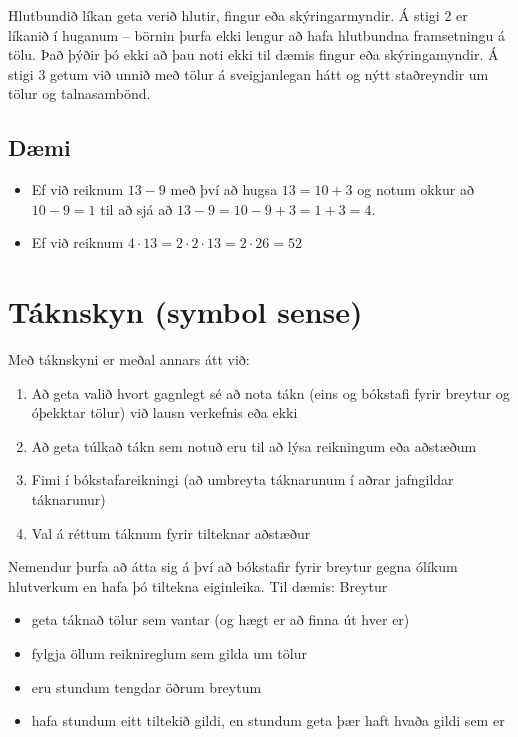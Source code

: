 \documentclass[
  icelandic,
]{book}
\providecommand{\tightlist}{%
  \setlength{\itemsep}{0pt}\setlength{\parskip}{0pt}}
\begin{document}
Hlutbundið líkan geta verið hlutir, fingur eða skýringarmyndir. Á stigi 2 er líkanið í huganum -- börnin þurfa ekki lengur að hafa hlutbundna framsetningu á tölu. Það þýðir þó ekki að þau noti ekki til dæmis fingur eða skýringamyndir. Á stigi 3 getum við unnið með tölur á sveigjanlegan hátt og nýtt staðreyndir um tölur og talnasambönd.

\subsection{Dæmi}\label{duxe6mi}

\begin{itemize}
\tightlist
\item
  Ef við reiknum \(13-9\) með því að hugsa \(13 = 10 + 3\) og notum okkur að \(10-9=1\) til að sjá að \(13-9 = 10 - 9 + 3 = 1 + 3 = 4\).
\item
  Ef við reiknum \(4 \cdot 13 = 2 \cdot 2 \cdot 13 = 2 \cdot 26 = 52\)
\end{itemize}

\section{Táknskyn (symbol sense)}\label{tuxe1knskyn-symbol-sense}

Með táknskyni er meðal annars átt við:

\begin{enumerate}
\def\labelenumi{\alph{enumi}.}
\tightlist
\item
  Að geta valið hvort gagnlegt sé að nota tákn (eins og bókstafi fyrir breytur og óþekktar tölur) við lausn verkefnis eða ekki
\item
  Að geta túlkað tákn sem notuð eru til að lýsa reikningum eða aðstæðum
\item
  Fimi í bókstafareikningi (að umbreyta táknarunum í aðrar jafngildar táknarunur)
\item
  Val á réttum táknum fyrir tilteknar aðstæður
\end{enumerate}

Nemendur þurfa að átta sig á því að bókstafir fyrir breytur gegna ólíkum hlutverkum en hafa þó tiltekna eiginleika. Til dæmis: Breytur

\begin{itemize}
\tightlist
\item
  geta táknað tölur sem vantar (og hægt er að finna út hver er)
\item
  fylgja öllum reiknireglum sem gilda um tölur
\item
  eru stundum tengdar öðrum breytum
\item
  hafa stundum eitt tiltekið gildi, en stundum geta þær haft hvaða gildi sem er
\end{itemize}
\end{document}
